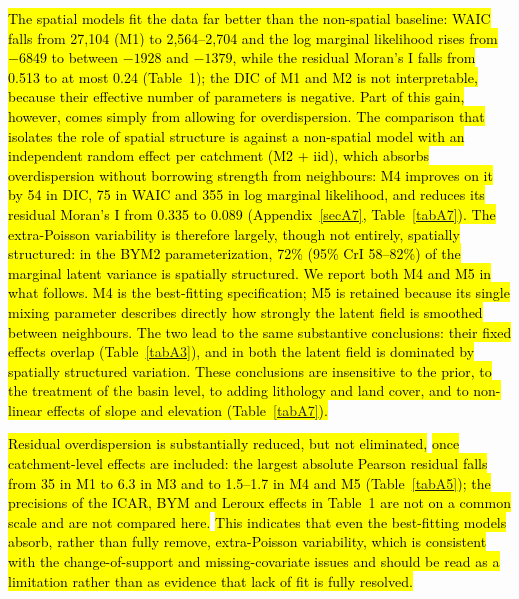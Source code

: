 \documentclass[journal abbreviation, manuscript]{copernicus}
\newcommand{\hlE}[1]{{\sethlcolor{edcyan}\hl{#1}}}
\begin{document}
\hlE{The spatial models fit the data far better than the non-spatial baseline: WAIC falls from 27,104 (M1) to 2,564--2,704 and the log marginal likelihood rises from $-6849$ to between $-1928$ and $-1379$, while the residual Moran's I falls from 0.513 to at most 0.24 (Table~1); the DIC of M1 and M2 is not interpretable, because their effective number of parameters is negative. Part of this gain, however, comes simply from allowing for overdispersion. The comparison that isolates the role of spatial structure is against a non-spatial model with an independent random effect per catchment (M2 + iid), which absorbs overdispersion without borrowing strength from neighbours: M4 improves on it by 54 in DIC, 75 in WAIC and 355 in log marginal likelihood, and reduces its residual Moran's I from 0.335 to 0.089 (\mbox{Appendix~\ref{secA7}}, \mbox{Table~\ref{tabA7}}). The extra-Poisson variability is therefore largely, though not entirely, spatially structured: in the BYM2 parameterization, 72\% (95\% CrI 58--82\%) of the marginal latent variance is spatially structured. We report both M4 and M5 in what follows. M4 is the best-fitting specification; M5 is retained because its single mixing parameter describes directly how strongly the latent field is smoothed between neighbours. The two lead to the same substantive conclusions: their fixed effects overlap (\mbox{Table~\ref{tabA3}}), and in both the latent field is dominated by spatially structured variation. These conclusions are insensitive to the prior, to the treatment of the basin level, to adding lithology and land cover, and to non-linear effects of slope and elevation (\mbox{Table~\ref{tabA7}}).}

\hl{Residual overdispersion is substantially reduced, but not eliminated,} \hlE{once catchment-level effects are included: the largest absolute Pearson residual falls from 35 in M1 to 6.3 in M3 and to 1.5--1.7 in M4 and M5 (\mbox{Table~\ref{tabA5}}); the precisions of the ICAR, BYM and Leroux effects in Table~1 are not on a common scale and are not compared here.} \hl{ 
This indicates that even the best-fitting models absorb, rather than fully remove, extra-Poisson variability, which is consistent with the change-of-support and missing-covariate issues and should be read as a limitation rather than as evidence that lack of fit is fully resolved.}
\end{document}
